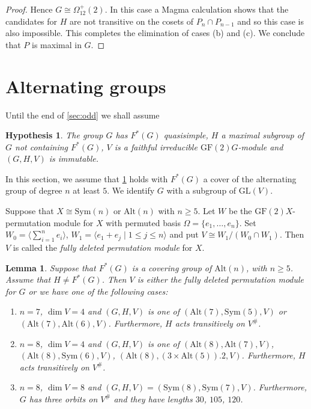 \documentclass[12pt]{amsart}
\newtheorem{lemma}[theorem]{Lemma}
\newtheorem{hypothesis}[theorem]{Hypothesis}
\theoremstyle{remark}
\theoremstyle{notation}
\theoremstyle{definition}
\newcommand{\GF}{\mathrm{GF}}
\newcommand{\GL}{\mathrm{GL}}
\newcommand{\0}{\emptyset}
\newcommand{\Sym}{\mathrm{Sym}}
\newcommand{\Alt}{\mathrm{Alt}}
\begin{document}
\begin{proof}
 Hence $G \cong \Omega_{12}^+(2)$. In this case  a  {\sc Magma} calculation shows that the candidates for $H$ are not transitive on the cosets of $P_{n} \cap P_{n-1}$ and so this case is also impossible. This completes the elimination  of cases (b) and (c). We conclude that $P$ is maximal in $G$.
\end{proof}




\section{Alternating groups}\label{sec:alternating groups}

Until the end of \cref{sec:odd} we shall assume
 \begin{hypothesis}\label{hyp} The group $G$ has $F^*(G)$    quasisimple, $H$ a maximal subgroup of $G$ not containing $F^*(G)$,  $V$ is a faithful irreducible $\GF(2)G$-module and
$(G,H,V)$ is immutable.
\end{hypothesis}

In this section, we assume that \cref{hyp} holds with $F^*(G)$ a  cover of the alternating group of degree $n$   at least $5$. We identify $G$  with a subgroup of $\GL(V)$.


Suppose that $X \cong \Sym(n)$ or $\Alt(n)$ with $n \ge 5$.  Let $W$ be the $\GF(2)X$-permutation module for $X$ with permuted basis $\Omega=\{e_1, \dots, e_n\}$.  Set $W_0= \langle \sum_{i=1}^n e_i\rangle$, $W_1= \langle e_1+e_j\mid 1\le j \le n\rangle$ and put  $V \cong W_1/(W_0\cap W_1)$. Then $V$ is called the \emph{fully deleted permutation module} for $X$.




\begin{lemma}\label{lem:alt cases}
Suppose that $F^*(G)$ is a covering group of $\Alt(n)$, with $n \ge 5$. Assume that $H \ne F^*(G)$. Then   $V$ is either the fully deleted permutation module for $G$ or we have one of the following cases:
\begin{enumerate}
\item $n=7$, $\dim V= 4$ and $(G,H,V)$ is one of $(\Alt(7), \Sym(5), V)$  or $(\Alt(7),\Alt(6),V)$. Furthermore, $H$ acts transitively on $V^\#$.
 \item $n=8$, $\dim V=4$ and $(G,H,V) $ is one of $(\Alt(8),\Alt(7),V)$, $(\Alt(8),\Sym(6),V)$, $(\Alt(8),(3\times \Alt(5)).2,V)$. Furthermore, $H$ acts transitively on $V^\#$.
 \item $n=8$, $\dim V=8$ and $(G,H,V)= (\Sym(8),\Sym(7),V)$. Furthermore, $G$ has three orbits on $V^\#$ and they have lengths $30$, $105$, $120$.
\end{enumerate}
\end{lemma}
\end{document}
